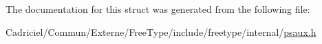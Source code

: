 The documentation for this struct was generated from the following file\-:\begin{DoxyCompactItemize}
\item 
Cadriciel/\-Commun/\-Externe/\-Free\-Type/include/freetype/internal/\hyperlink{psaux_8h}{psaux.\-h}\end{DoxyCompactItemize}
